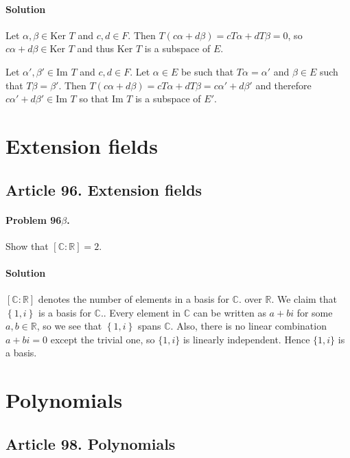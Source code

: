 \paragraph*{Solution}
Let $\alpha, \beta \in \mbox{Ker } T$ and $c, d \in F$. Then $T(c\alpha + d\beta)
= c T \alpha + d T \beta = 0$, so $c\alpha + d\beta \in \mbox{Ker } T$ and thus
$\mbox{Ker } T$ is a subspace of $E$.

Let $\alpha ', \beta ' \in \mbox{Im } T$ and $c, d \in F$. Let $\alpha \in E$ be
such that $T\alpha = \alpha '$ and $\beta \in E$ such that $T\beta = \beta '$.
Then $T(c \alpha + d \beta) = c T \alpha + d T \beta = c \alpha ' + d \beta '$
and therefore $c \alpha ' + d \beta ' \in \mbox{Im } T$ so that $\mbox{Im } T$ is
a subspace of $E'$.


\section{Extension fields}

\subsection{Article 96. Extension fields}

\paragraph{Problem 96$\beta$.}
Show that $\left[ \mathbb{C} : \mathbb{R} \right] = 2$.

\paragraph{Solution}
$\left[ \mathbb{C} : \mathbb{R} \right]$ denotes the number of elements in a
basis for $\mathbb{C} $. over $\mathbb{R}$. We claim that $\left\{ 1, i \right\}$
is a basis for $\mathbb{C}$.. Every element in $\mathbb{C}$ can be written as
$a + bi$ for some $a, b \in \mathbb{R}$, so we see that $\left\{ 1, i \right\}$
spans $\mathbb{C}$. Also, there is no linear combination $a + bi = 0$ except the
trivial one, so $\{ 1, i \}$ is linearly independent. Hence $\{ 1, i \}$ is a
basis.


\section{Polynomials}

\subsection{Article 98. Polynomials}

